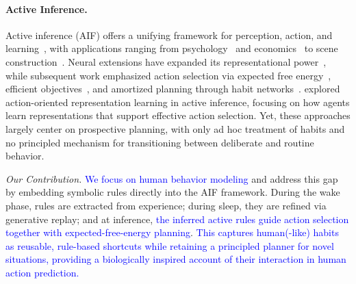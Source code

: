 \documentclass{article} %
\newcommand{\revise}[1]{\textcolor{blue}{#1}}
\newcommand{\Shuang}[1]{{\color{red}{\sf[Shuang: #1]}}}
\newcommand{\Chao}[1]{{\color{blue}{\sf[Chao: #1]}}}
\begin{document}

\paragraph{Active Inference.} 
Active inference (AIF) offers a unifying framework for perception, action, and learning~\citep{mazzaglia2022free}, with applications ranging from psychology~\citep{goette2023validation, demekas2020investigation} and economics~\citep{henriksen2020variational} to scene construction~\citep{mirza2016scene, heins2020deep}. Neural extensions have expanded its representational power~\citep{ueltzhoffer2018deep}, while subsequent work emphasized action selection via expected free energy~\citep{friston2016active, friston2015active, friston2021sophisticated, millidge2020relationship}, efficient objectives~\citep{mazzaglia2021contrastive}, and amortized planning through habit networks~\citep{fountas2020deep}. \citet{tschantz2020learning} explored action-oriented representation learning in active inference, focusing on how agents learn representations that support effective action selection. Yet, these approaches largely center on prospective planning, with only ad hoc treatment of habits and no principled mechanism for transitioning between deliberate and routine behavior.

\textit{Our Contribution.} \revise{We focus on human behavior modeling} and address this gap by embedding symbolic rules directly into the AIF framework. During the wake phase, rules are extracted from experience; during sleep, they are refined via generative replay; and at inference, \revise{the inferred active rules guide action selection together with expected-free-energy planning}. \revise{This captures human(-like) habits as reusable, rule-based shortcuts while retaining a principled planner for novel situations, providing a biologically inspired account of their interaction in human action prediction.}
\end{document}

